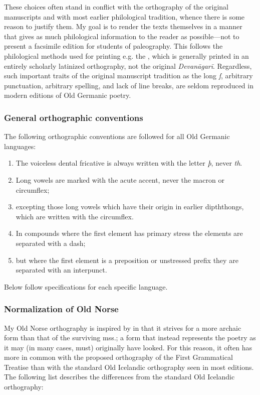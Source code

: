     These choices often stand in conflict with the orthography of the original manuscripts and with most earlier philological tradition, whence there is some reason to justify them.  My goal is to render the texts themselves in a manner that gives as much philological information to the reader as possible—not to present a facsimile edition for students of paleography.  This follows the philological methods used for printing e.g. the \Rigveda, which is generally printed in an entirely scholarly latinized orthography, not the original \emph{Devanāgarī}.  Regardless, such important traits of the original manuscript tradition as the long \emph{ſ}, arbitrary punctuation, arbitrary spelling, and lack of line breaks, are seldom reproduced in modern editions of Old Germanic poetry.

    \subsubsection{General orthographic conventions}

    The following orthographic conventions are followed for all Old Germanic languages:

    \begin{enumerate}
    \item The voiceless dental fricative is always written with the letter \emph{þ}, never \emph{th}.
    \item Long vowels are marked with the acute accent, never the macron or circumflex;
    \item excepting those long vowels which have their origin in earlier dipththongs, which are written with the circumflex.
    \item In compounds where the first element has primary stress the elements are separated with a dash;
    \item but where the first element is a preposition or unstressed prefix they are separated with an interpunct.
    \end{enumerate}

    Below follow specifications for each specific language.

    \subsubsection{Normalization of Old Norse}

    My Old Norse orthography is inspired by \textcite{FinnurEdda} in that it strives for a more archaic form than that of the surviving mss.; a form that instead represents the poetry as it may (in many cases, must) originally have looked. For this reason, it often has more in common with the proposed orthography of the First Grammatical Treatise than with the standard Old Icelandic orthography seen in most editions. The following list describes the differences from the standard Old Icelandic orthography:

